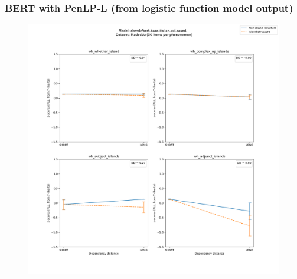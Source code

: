 \subsubsection{BERT with PenLP-L (from logistic function model output)}
\begin{figure}[h]
	\centering
	\includegraphics[width=1\textwidth]{images/Chapter1/Madeddu_wh_dbmdz_bert-base-italian-xxl-cased_PLL-zscores-likert-2022-07-11.png} 
\end{figure}

\clearpage
